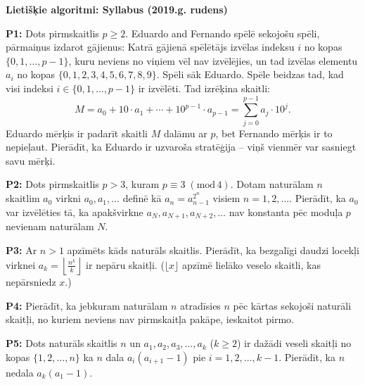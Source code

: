 \documentclass[11pt]{article}
\newenvironment{uzdevums}[1][\unskip]{%
\vspace{3mm}
\noindent
\textbf{#1:}
\noindent}
{}
\begin{document}
\thispagestyle{empty}

{\Large \bf Lietišķie algoritmi: Syllabus (2019.g. rudens)}

\begin{uzdevums}[P1]
Dots pirmskaitlis $p \geq 2$.
Eduardo and Fernando spēlē sekojošu spēli, pārmaiņus
izdarot gājienus: Katrā gājienā spēlētājs izvēlas 
indeksu $i$ no kopas 
$\{0,1,\ldots,p-1\}$, 
kuru neviens no viņiem vēl nav izvēlējies, un 
tad izvēlas elementu $a_i$ no kopas
$\{0, 1, 2, 3, 4, 5, 6, 7, 8, 9\}$. 
Spēli sāk Eduardo. Spēle beidzas tad, kad visi 
indeksi $i \in \{0,1,\ldots,p-1\}$ ir izvēlēti. 
Tad izrēķina skaitli: 
$$M = a_0 + 10 \cdot a_1 + \cdots + 
10^{p-1} \cdot a_{p-1} =
\sum_{j=0}^{p-1} a_j \cdot 10^j.$$
Eduardo mērķis ir padarīt skaitli $M$ dalāmu ar $p$, 
bet Fernando mērķis ir to nepieļaut.  
Pierādīt, ka Eduardo ir uzvaroša stratēģija -- viņš
vienmēr var sasniegt savu mērķi.
\end{uzdevums}

\begin{uzdevums}[P2]
Dots pirmskaitlis $p>3$, kuram $p \equiv 3\;(\mbox{mod}\,4)$. 
Dotam naturālam $n$
skaitlim $a_0$ virkni $a_0, a_1,\ldots$ definē kā 
$a_n = a_{n-1}^{2^n}$ visiem $n = 1, 2,\ldots$. 
Pierādīt, ka $a_0$ var izvēlēties
tā, ka apakšvirkne $a_N, a_{N+1}, a_{N+2},\ldots$ nav konstanta 
pēc moduļa $p$ nevienam naturālam $N$.
\end{uzdevums}

\begin{uzdevums}[P3]
Ar $n > 1$ apzīmēts kāds naturāls skaitlis. Pierādīt, ka
bezgalīgi daudzi locekļi virknei 
$a_k=\left\lfloor\frac{n^k}{k}\right\rfloor$
ir nepāru skaitļi. ($\lfloor x\rfloor$ apzīmē 
lielāko veselo skaitli, kas nepārsniedz $x$.)
\end{uzdevums}

\begin{uzdevums}[P4]
Pierādīt, ka jebkuram naturālam $n$ atradīsies
$n$ pēc kārtas sekojoši naturāli skaitļi, no kuriem neviens
nav pirmskaitļa pakāpe, ieskaitot pirmo. 
\end{uzdevums}

\begin{uzdevums}[P5]
Dots naturāls skaitlis $n$ un $a_1, a_2, a_3, \ldots, a_k$ ($k \geq 2$) 
ir dažādi veseli skaitļi no kopas $\{1, 2, \ldots , n\}$ ka $n$ dala $a_i (a_{i+1} - 1)$
pie $i = 1, 2,\ldots,k-1$. Pierādīt, ka $n$ nedala $a_k(a_1-1)$.
\end{uzdevums}
\end{document}

